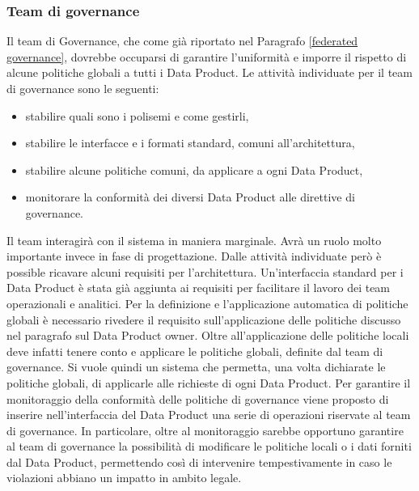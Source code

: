 \documentclass[12pt]{report}
\begin{document}
\subsubsection{Team di governance}
Il team di Governance, che come già riportato nel Paragrafo \ref{federated governance}, dovrebbe occuparsi di garantire l'uniformità e imporre il rispetto di alcune politiche globali a tutti i Data Product. 
Le attività individuate per il team di governance sono le seguenti:
\begin{itemize}
    \item stabilire quali sono i polisemi e come gestirli,
    \item stabilire le interfacce e i formati standard, comuni all'architettura,
    \item stabilire alcune politiche comuni, da applicare a ogni Data Product,
    \item monitorare la conformità dei diversi Data Product alle direttive di governance.
\end{itemize}
Il team interagirà con il sistema in maniera marginale. 
Avrà un ruolo molto importante invece in fase di progettazione.
Dalle attività individuate però è possible ricavare alcuni requisiti per l'architettura.
Un'interfaccia standard per i Data Product è stata già aggiunta ai requisiti per facilitare il lavoro dei team operazionali e analitici.
Per la definizione e l'applicazione automatica di politiche globali è necessario rivedere il requisito sull'applicazione delle politiche discusso nel paragrafo sul Data Product owner.
Oltre all'applicazione delle politiche locali deve infatti tenere conto e applicare le politiche globali, definite dal team di governance. 
Si vuole quindi un sistema che permetta, una volta dichiarate le politiche globali, di applicarle alle richieste di ogni Data Product.
Per garantire il monitoraggio della conformità delle politiche di governance viene proposto di inserire nell'interfaccia del Data Product una serie di operazioni riservate al team di governance.
In particolare, oltre al monitoraggio sarebbe opportuno garantire al team di governance la possibilità di modificare le politiche locali o i dati forniti dal Data Product, permettendo così di intervenire tempestivamente in caso le violazioni abbiano un impatto in ambito legale.
\end{document}
